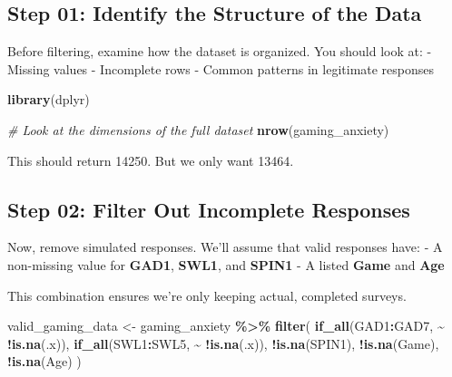 \documentclass[
]{book}
\newenvironment{Shaded}{\begin{snugshade}}{\end{snugshade}}
\newcommand{\CommentTok}[1]{\textcolor[rgb]{0.56,0.35,0.01}{\textit{#1}}}
\newcommand{\FunctionTok}[1]{\textcolor[rgb]{0.13,0.29,0.53}{\textbf{#1}}}
\newcommand{\NormalTok}[1]{#1}
\newcommand{\OtherTok}[1]{\textcolor[rgb]{0.56,0.35,0.01}{#1}}
\newcommand{\SpecialCharTok}[1]{\textcolor[rgb]{0.81,0.36,0.00}{\textbf{#1}}}
\begin{document}
\subsection*{Step 01: Identify the Structure of the Data}\label{step-01-identify-the-structure-of-the-data}

Before filtering, examine how the dataset is organized. You should look at:
- Missing values
- Incomplete rows
- Common patterns in legitimate responses

\begin{Shaded}
\begin{Highlighting}[]
\FunctionTok{library}\NormalTok{(dplyr)}

\CommentTok{\# Look at the dimensions of the full dataset}
\FunctionTok{nrow}\NormalTok{(gaming\_anxiety)}
\end{Highlighting}
\end{Shaded}

This should return 14250. But we only want 13464.

\subsection*{Step 02: Filter Out Incomplete Responses}\label{step-02-filter-out-incomplete-responses}

Now, remove simulated responses. We'll assume that valid responses have:
- A non-missing value for \textbf{GAD1}, \textbf{SWL1}, and \textbf{SPIN1}
- A listed \textbf{Game} and \textbf{Age}

This combination ensures we're only keeping actual, completed surveys.

\begin{Shaded}
\begin{Highlighting}[]
\NormalTok{valid\_gaming\_data }\OtherTok{\textless{}{-}}\NormalTok{ gaming\_anxiety }\SpecialCharTok{\%\textgreater{}\%}
  \FunctionTok{filter}\NormalTok{(}
    \FunctionTok{if\_all}\NormalTok{(GAD1}\SpecialCharTok{:}\NormalTok{GAD7, }\SpecialCharTok{\textasciitilde{}} \SpecialCharTok{!}\FunctionTok{is.na}\NormalTok{(.x)),}
    \FunctionTok{if\_all}\NormalTok{(SWL1}\SpecialCharTok{:}\NormalTok{SWL5, }\SpecialCharTok{\textasciitilde{}} \SpecialCharTok{!}\FunctionTok{is.na}\NormalTok{(.x)),}
    \SpecialCharTok{!}\FunctionTok{is.na}\NormalTok{(SPIN1),}
    \SpecialCharTok{!}\FunctionTok{is.na}\NormalTok{(Game),}
    \SpecialCharTok{!}\FunctionTok{is.na}\NormalTok{(Age)}
\NormalTok{  )}
\end{Highlighting}
\end{Shaded}
\end{document}
